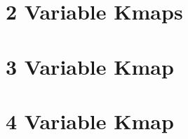\documentclass{article}
\begin{document}
\section{2 Variable Kmaps}
\begin{kmap2var}
\end{kmap2var}
\begin{kmap2var}
\end{kmap2var}

\section{3 Variable Kmap}
\begin{kmap3var}
\end{kmap3var}
\begin{kmap3var}
\end{kmap3var}

\section{4 Variable Kmap}
\begin{kmap4var}
\end{kmap4var}
\begin{kmap4var}
\end{kmap4var}
\pagebreak
\end{document}
